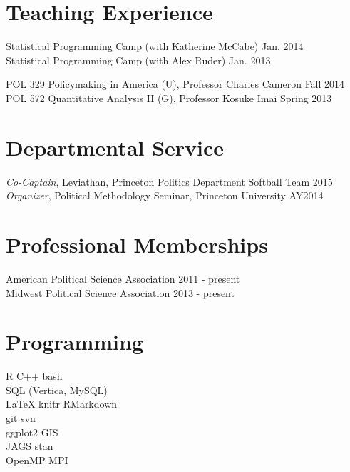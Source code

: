 \documentclass[]{deedy-resume-openfont}
\begin{document}
\section{Teaching Experience}
Statistical Programming Camp (with Katherine McCabe) \hfill Jan. 2014\\
Statistical Programming Camp (with Alex Ruder) \hfill Jan. 2013\\\vspace{2mm}

POL 329 Policymaking in America (U), Professor Charles Cameron \hfill Fall 2014\\
POL 572 Quantitative Analysis II (G), Professor Kosuke Imai \hfill Spring 2013
\sectionsep

\section{Departmental Service}
{\it Co-Captain}, Leviathan, Princeton Politics Department Softball Team \hfill 2015\\
{\it Organizer}, Political Methodology Seminar, Princeton University \hfill AY2014
\sectionsep

\section{Professional Memberships}
American Political Science Association \hfill 2011 - present\\
Midwest Political Science Association \hfill 2013 - present
\sectionsep


\section{Programming}
R \textbullet{} C++ \textbullet{} bash \\
 SQL (Vertica, MySQL)\\
 \LaTeX \textbullet{} knitr \textbullet{} RMarkdown\\
 git\textbullet{} svn\\
 ggplot2\textbullet{} GIS\\
 JAGS\textbullet{} stan\\
 OpenMP\textbullet{} MPI
\sectionsep
\end{document}

